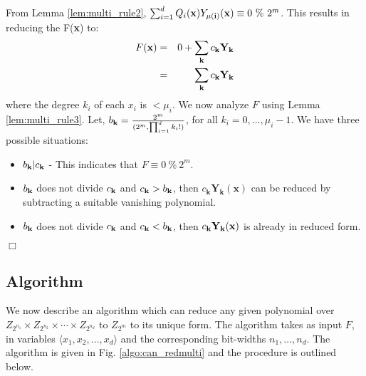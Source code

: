 From Lemma \ref{lem:multi_rule2}, $\sum _{i=1}^d Q_i({\bf x}) Y_{{\bf
    \mu}(\textbf{i})}({\bf x}) \equiv 0 ~\% ~2^m$. This results in
    reducing the F({\bf x}) to:
\begin{eqnarray}
F({\bf x}) &=& 0 + \sum_{\textbf{k}}c_\textbf{k}\textbf{Y}_\textbf{k} \nonumber \\
           &=& \sum_{\textbf{k}}c_\textbf{k}\textbf{Y}_\textbf{k} 
\end{eqnarray}
where the degree $k_i$ of each $x_i$ is $< \mu_i$. We now analyze $F$
using Lemma \ref{lem:multi_rule3}. Let, $b_{\bf k} = {{2^m} \over
{(2^m,\prod_{i=1}^{d}k_i!)}}$, for all $k_i = 0, \ldots,
\mu_i-1$. We have three possible situations:
\begin{itemize}
\item $b_{\bf k}|c_{\bf k}$ - This indicates that $F \equiv 0 ~\% ~2^m$.
\item $b_{\bf k}$ does not divide $c_{\bf k}$ and $c_{\bf k} > b_{\bf
  k}$, then $c_\textbf{k} \textbf{Y}_\textbf{k}(\textbf{x})$ can be
  reduced by subtracting a suitable vanishing polynomial. 
\item $b_{\bf k}$ does not divide $c_{\bf k}$ and $c_{\bf k} < b_{\bf
  k}$, then $c_{\bf k}{\bf Y}_{\bf k}({\bf x})$ is already in reduced form.
\end{itemize}
{\hfill$\Box$}


\subsection{Algorithm}
We now describe an algorithm which can reduce any given polynomial
over $Z_{2^{n_1}}\times Z_{2^{n_2}} \times \cdots \times Z_{2^{n_d}}$
to $Z_{2^{m}}$ to its unique form. The algorithm takes as input $F$,
in variables $\langle x_1, x_2, \ldots, x_d \rangle$ and the
corresponding bit-widths $n_1, \ldots, n_d$.  The algorithm is given
in Fig. \ref{algo:can_redmulti} and the procedure is outlined below.

